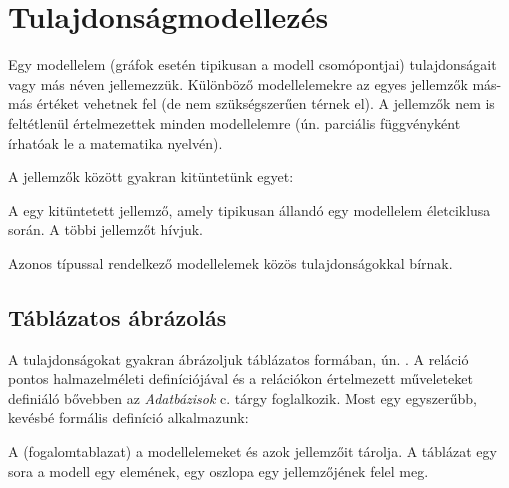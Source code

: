 \section{Tulajdonságmodellezés}

Egy modellelem (gráfok esetén tipikusan a modell csomópontjai) tulajdonságait  vagy más néven  jellemezzük. Különböző modellelemekre az egyes jellemzők más-más értéket vehetnek fel (de nem szükségszerűen térnek el). A jellemzők nem is feltétlenül értelmezettek minden modellelemre (ún. parciális függvényként írhatóak le a matematika nyelvén).

A jellemzők között gyakran kitüntetünk egyet:

\begin{definicio}
A  egy kitüntetett jellemző, amely tipikusan állandó egy modellelem életciklusa során. A többi jellemzőt  hívjuk.
\end{definicio}

Azonos típussal rendelkező modellelemek közös tulajdonságokkal bírnak.

\subsection{Táblázatos ábrázolás}

A tulajdonságokat gyakran ábrázoljuk táblázatos formában, ún. . A reláció pontos halmazelméleti definíciójával és a relációkon értelmezett műveleteket definiáló  bővebben az \emph{Adatbázisok} c. tárgy foglalkozik. Most egy egyszerűbb, kevésbé formális definíció alkalmazunk:

\begin{definicio}
A  (fogalom{tablazat}) a modellelemeket és azok jellemzőit tárolja. A táblázat egy sora a modell egy elemének, egy oszlopa egy jellemzőjének felel meg.
\end{definicio}

